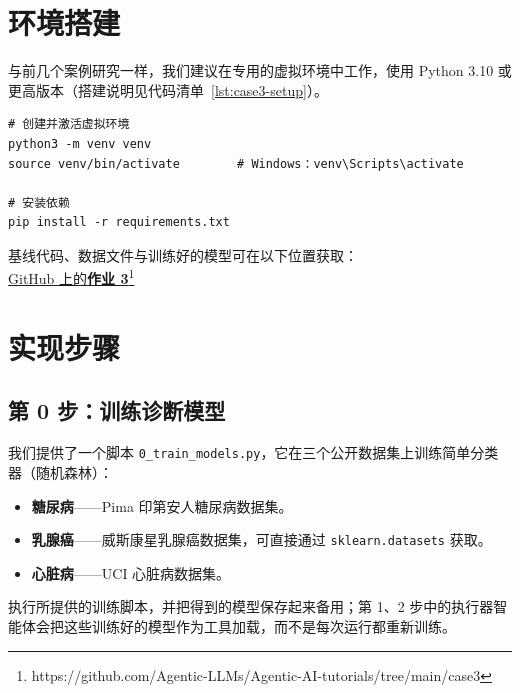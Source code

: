 \section{环境搭建}
\label{sec:case3-setup}

与前几个案例研究一样，我们建议在专用的虚拟环境中工作，使用 Python 3.10 或更高版本（搭建说明见代码清单~\ref{lst:case3-setup}）。

\begin{listing}[!ht]
\begin{verbatim}
# 创建并激活虚拟环境
python3 -m venv venv
source venv/bin/activate        # Windows：venv\Scripts\activate

# 安装依赖
pip install -r requirements.txt
\end{verbatim}
\caption{搭建案例研究 3 的环境}
\label{lst:case3-setup}
\end{listing}

\begin{tcolorbox}[
    colback=blue!10!white,
    colframe=blue!85!black,
    title={\faRocket\quad 在 GitHub 上查看！},
    fonttitle=\bfseries,
    coltitle=white,
    boxrule=1pt,
    arc=4pt,
    left=5pt,
    right=5pt,
    top=5pt,
    bottom=5pt,
    enhanced
]
基线代码、数据文件与训练好的模型可在以下位置获取：\\
\href{https://github.com/Agentic-LLMs/Agentic-AI-tutorials/tree/main/case3}{\faCode\quad GitHub 上的\textbf{作业 3}\footnote{https://github.com/Agentic-LLMs/Agentic-AI-tutorials/tree/main/case3}}
\end{tcolorbox}


\section{实现步骤}
\label{sec:case3-implementation}

\subsection{第 0 步：训练诊断模型}

我们提供了一个脚本 \texttt{0\_train\_models.py}，它在三个公开数据集上训练简单分类器（随机森林）：

\begin{itemize}
    \item \textbf{糖尿病}——Pima 印第安人糖尿病数据集。
    \item \textbf{乳腺癌}——威斯康星乳腺癌数据集，可直接通过 \texttt{sklearn.datasets} 获取。
    \item \textbf{心脏病}——UCI 心脏病数据集。
\end{itemize}
%
执行所提供的训练脚本，并把得到的模型保存起来备用；第 1、2 步中的执行器智能体会把这些训练好的模型作为工具加载，而不是每次运行都重新训练。

